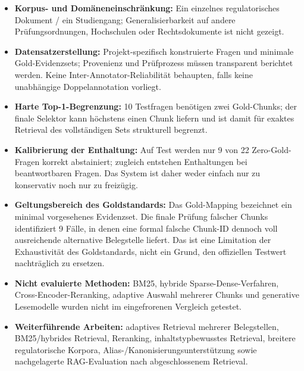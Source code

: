 \documentclass[11pt]{article}
\begin{document}
\begin{leitfragenbox}
\begin{itemize}
    \item \textbf{Korpus- und Dom\"aneneinschr\"ankung:} Ein einzelnes regulatorisches Dokument / ein Studiengang; Generalisierbarkeit auf andere Pr\"ufungsordnungen, Hochschulen oder Rechtsdokumente ist nicht gezeigt.
    \item \textbf{Datensatzerstellung:} Projekt-spezifisch konstruierte Fragen und minimale Gold-Evidenzsets; Provenienz und Prüfprozess m\"ussen transparent berichtet werden. Keine Inter-Annotator-Reliabilität behaupten, falls keine unabh\"angige Doppelannotation vorliegt.
    \item \textbf{Harte Top-1-Begrenzung:} 10 Testfragen ben\"otigen zwei Gold-Chunks; der finale Selektor kann h\"ochstens einen Chunk liefern und ist damit f\"ur exaktes Retrieval des vollständigen Sets strukturell begrenzt.
    \item \textbf{Kalibrierung der Enthaltung:} Auf Test werden nur 9 von 22 Zero-Gold-Fragen korrekt abstainiert; zugleich entstehen Enthaltungen bei beantwortbaren Fragen. Das System ist daher weder einfach nur zu konservativ noch nur zu freizügig.
    \item \textbf{Geltungsbereich des Goldstandards:} Das Gold-Mapping bezeichnet ein minimal vorgesehenes Evidenzset. Die finale Prüfung falscher Chunks identifiziert 9 F\"alle, in denen eine formal falsche Chunk-ID dennoch voll ausreichende alternative Belegstelle liefert. Das ist eine Limitation der Exhaustivit\"at des Goldstandards, nicht ein Grund, den offiziellen Testwert nachtr\"aglich zu ersetzen.
    \item \textbf{Nicht evaluierte Methoden:} BM25, hybride Sparse-Dense-Verfahren, Cross-Encoder-Reranking, adaptive Auswahl mehrerer Chunks und generative Lesemodelle wurden nicht im eingefrorenen Vergleich getestet.
    \item \textbf{Weiterführende Arbeiten:} adaptives Retrieval mehrerer Belegstellen, BM25/hybrides Retrieval, Reranking, inhaltstypbewusstes Retrieval, breitere regulatorische Korpora, Alias-/Kanonisierungsunterstützung sowie nachgelagerte RAG-Evaluation nach abgeschlossenem Retrieval.
\end{itemize}
\end{leitfragenbox}
\end{document}

